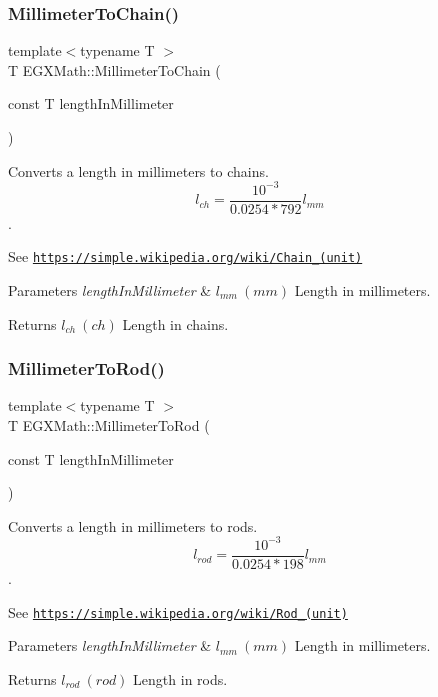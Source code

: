 \subsubsection{\texorpdfstring{Millimeter\+To\+Chain()}{MillimeterToChain()}}
{\footnotesize\ttfamily template$<$typename T $>$ \\
T E\+G\+X\+Math\+::\+Millimeter\+To\+Chain (\begin{DoxyParamCaption}\item[{const T}]{length\+In\+Millimeter }\end{DoxyParamCaption})}



Converts a length in millimeters to chains. \[ l_{ch}= \frac{10^{-3}}{0.0254 * 792} l_{mm} \]. 

See \href{https://simple.wikipedia.org/wiki/Chain_(unit)}{\tt https\+://simple.\+wikipedia.\+org/wiki/\+Chain\+\_\+(unit)} 
\begin{DoxyParams}{Parameters}
{\em length\+In\+Millimeter} & $ l_{mm}\ (mm)$ Length in millimeters. \\
\hline
\end{DoxyParams}
\begin{DoxyReturn}{Returns}
$ l_{ch}\ (ch)$ Length in chains. 
\end{DoxyReturn}
\mbox{\label{group___e_g_x_math-_conversions-_length_conversions-_s_i-_millimeter-_surveyors_ga658a03332f16e17bdd23bd770091b221}} 
\subsubsection{\texorpdfstring{Millimeter\+To\+Rod()}{MillimeterToRod()}}
{\footnotesize\ttfamily template$<$typename T $>$ \\
T E\+G\+X\+Math\+::\+Millimeter\+To\+Rod (\begin{DoxyParamCaption}\item[{const T}]{length\+In\+Millimeter }\end{DoxyParamCaption})}



Converts a length in millimeters to rods. \[ l_{rod}= \frac{10^{-3}}{0.0254 * 198} l_{mm} \]. 

See \href{https://simple.wikipedia.org/wiki/Rod_(unit)}{\tt https\+://simple.\+wikipedia.\+org/wiki/\+Rod\+\_\+(unit)} 
\begin{DoxyParams}{Parameters}
{\em length\+In\+Millimeter} & $ l_{mm}\ (mm)$ Length in millimeters. \\
\hline
\end{DoxyParams}
\begin{DoxyReturn}{Returns}
$ l_{rod}\ (rod)$ Length in rods. 
\end{DoxyReturn}
